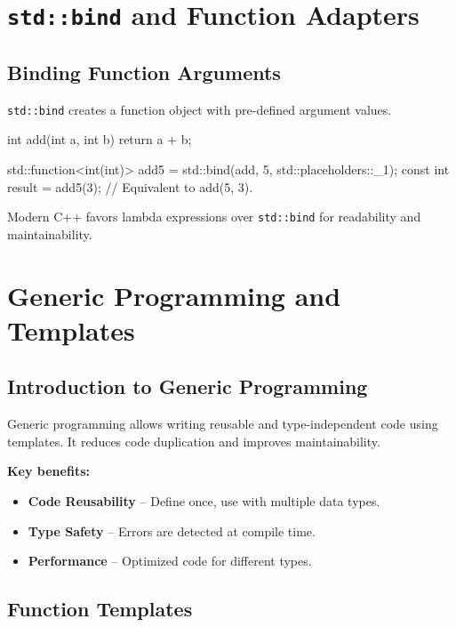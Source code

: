 \section{\texttt{std::bind} and Function Adapters}

\subsection{Binding Function Arguments}

\texttt{std::bind} creates a function object with pre-defined argument values.

\begin{codeblock}[language=C++]
int add(int a, int b) {
    return a + b;
}

std::function<int(int)> add5 = std::bind(add, 5, std::placeholders::_1);
const int result = add5(3); // Equivalent to add(5, 3).
\end{codeblock}

Modern C++ favors lambda expressions over \texttt{std::bind} for readability and maintainability.

\section{Generic Programming and Templates}

\subsection{Introduction to Generic Programming}

Generic programming allows writing reusable and type-independent code using templates. It reduces code duplication and improves maintainability.

\textbf{Key benefits:}

\begin{itemize}
    \item \textbf{Code Reusability} -- Define once, use with multiple data types.
    \item \textbf{Type Safety} -- Errors are detected at compile time.
    \item \textbf{Performance} -- Optimized code for different types.
\end{itemize}

\subsection{Function Templates}

